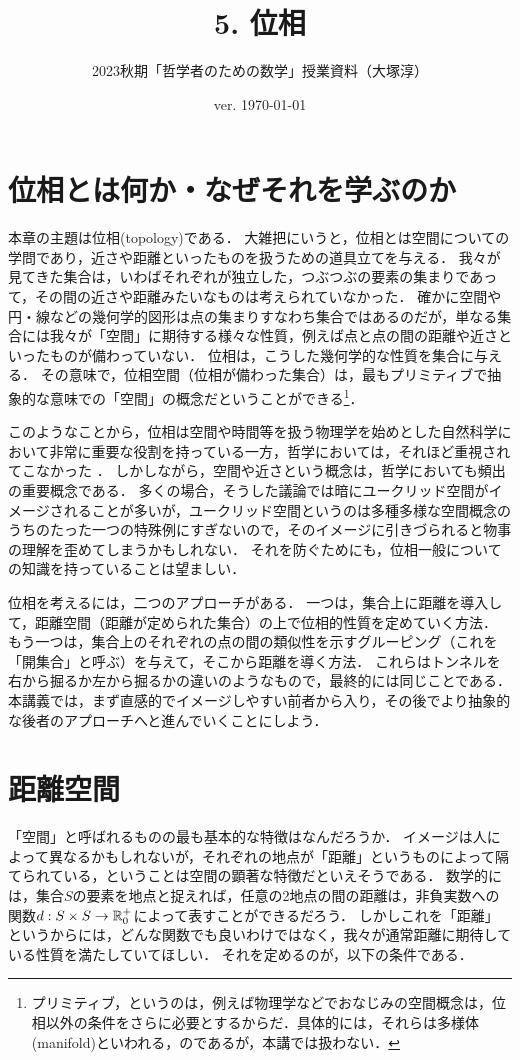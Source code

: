 \documentclass[11pt,a4paper, dvipdfmx]{jsarticle}
\begin{document}
\title{5. 位相}
\author{2023秋期「哲学者のための数学」授業資料（大塚淳）}
\date{ver. \today}
\maketitle

\section{位相とは何か・なぜそれを学ぶのか}

本章の主題は位相(topology)である．
大雑把にいうと，位相とは空間についての学問であり，近さや距離といったものを扱うための道具立てを与える．
我々が見てきた集合は，いわばそれぞれが独立した，つぶつぶの要素の集まりであって，その間の近さや距離みたいなものは考えられていなかった．
確かに空間や円・線などの幾何学的図形は点の集まりすなわち集合ではあるのだが，単なる集合には我々が「空間」に期待する様々な性質，例えば点と点の間の距離や近さといったものが備わっていない．
位相は，こうした幾何学的な性質を集合に与える．
その意味で，位相空間（位相が備わった集合）は，最もプリミティブで抽象的な意味での「空間」の概念だということができる\footnote{プリミティブ，というのは，例えば物理学などでおなじみの空間概念は，位相以外の条件をさらに必要とするからだ．具体的には，それらは多様体(manifold)といわれる，のであるが，本講では扱わない．}．

このようなことから，位相は空間や時間等を扱う物理学を始めとした自然科学において非常に重要な役割を持っている一方，哲学においては，それほど重視されてこなかった \citep{Mormann2020-ly, Fletcher2022-ve}．
しかしながら，空間や近さという概念は，哲学においても頻出の重要概念である．
多くの場合，そうした議論では暗にユークリッド空間がイメージされることが多いが，ユークリッド空間というのは多種多様な空間概念のうちのたった一つの特殊例にすぎないので，そのイメージに引きづられると物事の理解を歪めてしまうかもしれない．
それを防ぐためにも，位相一般についての知識を持っていることは望ましい．

位相を考えるには，二つのアプローチがある．
一つは，集合上に距離を導入して，距離空間（距離が定められた集合）の上で位相的性質を定めていく方法．
もう一つは，集合上のそれぞれの点の間の類似性を示すグルーピング（これを「開集合」と呼ぶ）を与えて，そこから距離を導く方法．
これらはトンネルを右から掘るか左から掘るかの違いのようなもので，最終的には同じことである．
本講義では，まず直感的でイメージしやすい前者から入り，その後でより抽象的な後者のアプローチへと進んでいくことにしよう．


\section{距離空間}
「空間」と呼ばれるものの最も基本的な特徴はなんだろうか．
イメージは人によって異なるかもしれないが，それぞれの地点が「距離」というものによって隔てられている，ということは空間の顕著な特徴だといえそうである．
数学的には，集合$S$の要素を地点と捉えれば，任意の2地点の間の距離は，非負実数への関数$d:S \times S \to \mathbb{R}^+_0$によって表すことができるだろう．
しかしこれを「距離」というからには，どんな関数でも良いわけではなく，我々が通常距離に期待している性質を満たしていてほしい．
それを定めるのが，以下の条件である．
\end{document}
